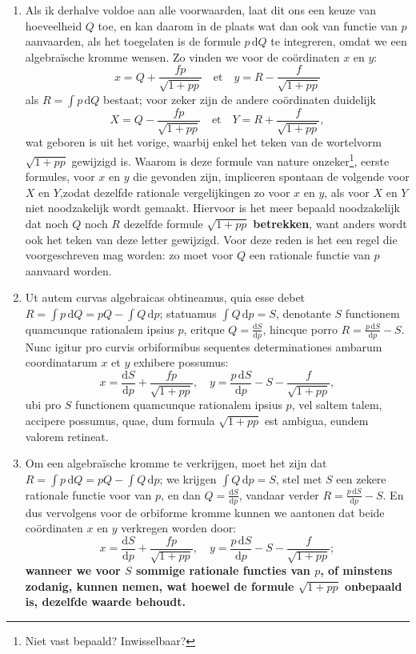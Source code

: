 \documentclass[10pt,a4paper]{article}
\newcommand{\switchenum}{\setcounter{enumi}{\arabic{enumi}-1}\switchcolumn}
\def\D{\mathrm{d}}
\begin{document}
\begin{paracol}{2}
\begin{enumerate}[topsep=1px]
		\switchenum
		\item Als ik derhalve voldoe aan alle voorwaarden, laat dit ons een keuze van hoeveelheid $Q$ toe, en kan daarom in de plaats wat dan ook van functie van $p$ aanvaarden, als het toegelaten is de formule $p\,\D Q$ te integreren, omdat we een algebraïsche kromme wensen. Zo vinden we voor de coördinaten $x$ en $y$:
		\[
			x = Q + \frac{fp}{\sqrt{1+pp}} \quad\text{et}\quad y = R - \frac{f}{\sqrt{1+pp}}
		\]
		als $R=\int p \,\D Q$ bestaat; voor zeker zijn de andere coördinaten duidelijk
		\[
			X = Q- \frac{fp}{\sqrt{1+pp}} \quad \text{et} \quad Y = R + \frac{f}{\sqrt{1+pp}},		
		\]
		wat geboren is uit het vorige, waarbij enkel het teken van de wortelvorm $\sqrt{1+pp}$ gewijzigd is. Waarom is deze formule van nature onzeker\footnote{Niet vast bepaald? Inwisselbaar?}, eerste formules, voor $x$ en $y$ die gevonden zijn, impliceren spontaan de volgende voor $X$ en $Y$,zodat dezelfde rationale vergelijkingen zo voor $x$ en $y$, als voor $X$ en $Y$ niet noodzakelijk wordt gemaakt. Hiervoor is het meer bepaald noodzakelijk dat noch $Q$ noch $R$ dezelfde formule $\sqrt{1+pp}$ \textbf{betrekken}, want anders wordt ook het teken van deze letter gewijzigd.  Voor deze reden is het een regel die voorgeschreven mag worden: zo moet voor $Q$ een rationale functie van $p$ aanvaard worden.
		
		
		\switchcolumn*
		
		\item Ut autem curvas algebraicas obtineamus, quia esse debet $R = \int p \,\D Q = pQ - \int Q \,\D p$; statuamus $\int Q \,\D p = S$, denotante $S$ functionem quamcunque rationalem ipsius $p$, eritque $Q = \frac{\D S}{\D p}$, hincque porro $R = \frac{p\,\D S}{\D p}-S$. Nunc igitur pro curvis orbiformibus sequentes determinationes ambarum coordinatarum $x$ et $y$ exhibere possumus:
		\[
			x = \frac{\D S}{\D p} + \frac{fp}{\sqrt{1+pp}}, \quad y = \frac{p\,\D S}{\D p} -S - \frac{f}{\sqrt{1+pp}},
		\]
		ubi pro $S$ functionem quamcunque rationalem ipsius $p$, vel saltem talem, accipere possumus, quae, dum formula $\sqrt{1+pp}$ est ambigua, eundem valorem retineat.
		
		\switchenum
		\item Om een algebraïsche kromme te verkrijgen, moet het zijn dat $R = \int p \,\D Q = pQ - \int Q \,\D p$; we krijgen  $\int Q \,\D p = S$, stel met $S$ een zekere rationale functie voor van $p$, en dan $Q = \frac{\D S}{\D p}$, vandaar verder $R = \frac{p\,\D S}{\D p}-S$. En dus vervolgens voor de orbiforme kromme kunnen we aantonen dat beide coördinaten $x$ en $y$ verkregen worden door: 
		\[
			x = \frac{\D S}{\D p} + \frac{fp}{\sqrt{1+pp}}, \quad y = \frac{p\,\D S}{\D p} -S - \frac{f}{\sqrt{1+pp}};
		\]
		\textbf{wanneer we voor $S$ sommige rationale functies van $p$, of minstens zodanig, kunnen nemen, wat hoewel de formule $\sqrt{1+pp}$ onbepaald is, dezelfde waarde behoudt.}
		

\end{enumerate}
\end{paracol}
\end{document}
